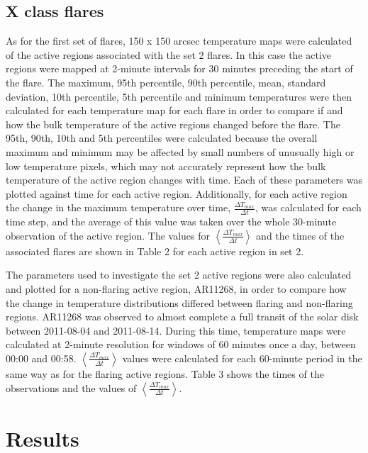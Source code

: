 \documentclass{article}
\begin{document}
\subsection{X class flares}
As for the first set of flares, 150 x 150 arcsec temperature maps were calculated of the active regions associated with the set 2 flares.
In this case the active regions were mapped at 2-minute intervals for 30 minutes preceding the start of the flare.
The maximum, 95th percentile, 90th percentile, mean, standard deviation, 10th percentile, 5th percentile and minimum temperatures were then calculated for each temperature map for each flare in order to compare if and how the bulk temperature of the active regions changed before the flare.
The 95th, 90th, 10th and 5th percentiles were calculated because the overall maximum and minimum may be affected by small numbers of unusually high or low temperature pixels, which may not accurately represent how the bulk temperature of the active region changes with time.
Each of these parameters was plotted against time for each active region.
Additionally, for each active region the change in the maximum temperature over time, $\frac{\Delta T_{max}}{\Delta t}$, was calculated for each time step, and the average of this value was taken over the whole 30-minute observation of the active region.
The values for $\left\langle \frac{\Delta T_{max}}{\Delta t}\right\rangle$ and the times of the associated flares are shown in Table 2 for each active region in set 2. %

The parameters used to investigate the set 2 active regions were also calculated and plotted for a non-flaring active region, AR11268, in order to compare how the change in temperature distributions differed between flaring and non-flaring regions.
AR11268 was observed to almost complete a full transit of the solar disk between 2011-08-04 and 2011-08-14.
During this time, temperature maps were calculated at 2-minute resolution for windows of 60 minutes once a day, between 00:00 and 00:58. $\left\langle \frac{\Delta T_{max}}{\Delta t}\right\rangle$ values were calculated for each 60-minute period in the same way as for the flaring active regions.
Table 3 shows the times of the observations and the values of $\left\langle \frac{\Delta T_{max}}{\Delta t}\right\rangle$.


\section{Results}
\end{document}
